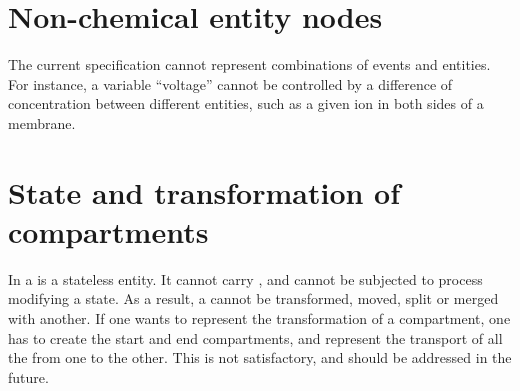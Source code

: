 \section{Non-chemical entity nodes}

The current specification cannot represent combinations of events and entities. For instance, a variable ``voltage'' cannot be controlled by a difference of concentration between different entities, such as a given ion in both sides of a membrane. 

\section{State and transformation of compartments}

In \SBGNPDLone a  is a stateless entity. It cannot carry  , and cannot be subjected to process modifying a state. As a result, a  cannot be transformed, moved, split or merged with another. If one wants to represent the transformation of a compartment, one has to create the start and end compartments, and represent the transport of all the  from one to the other. This is not satisfactory, and should be addressed in the future.
